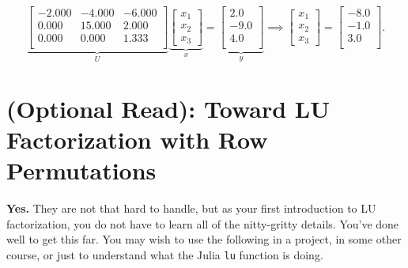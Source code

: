 $$ \underbrace{\left[
\begin{array}{rrr}
-2.000 & -4.000 & -6.000 \\
0.000 & 15.000 & 2.000 \\
0.000 & 0.000 & 1.333 \\
\end{array}
\right]}_{U} \underbrace{\begin{bmatrix}x_1 \\x_2 \\ x_3 \end{bmatrix}}_{x} =\underbrace{\left[
\begin{array}{r}
2.0 \\
-9.0 \\
4.0 \\
\end{array}
\right]}_{y} \implies\begin{bmatrix}x_1 \\x_2 \\ x_3 \end{bmatrix} = \left[
\begin{array}{r}
-8.0 \\
-1.0 \\
3.0 \\
\end{array}
\right]. $$
\Qed

\vspace*{.3cm}

\section{(Optional Read): Toward LU Factorization with Row Permutations}
\label{sec:LUwithRowPermutations}

\begin{tcolorbox}[sharp corners, colback=green!30, colframe=green!80!blue, title=\textbf{\large Are there Cases where our Simplified LU Factorization Process Fails?}]
 \textbf{Yes.} They are not that hard to handle, but as your first introduction to LU factorization, you do not have to learn all of the nitty-gritty details. You've done well to get this far. You may wish to use the following in a project, in some other course, or just to understand what the Julia \texttt{lu} function is doing.
\end{tcolorbox}
\vspace*{.7cm}


